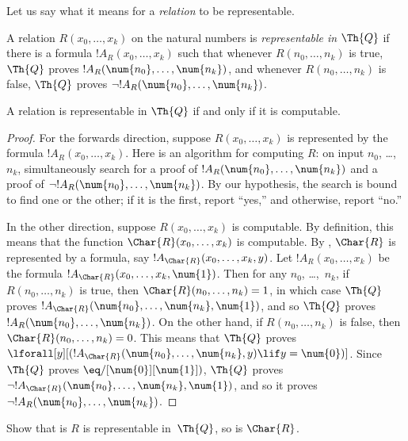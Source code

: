 \documentclass[../../../include/open-logic-section]{subfiles}
\begin{document}


Let us say what it means for a \emph{relation} to be representable.

\begin{defn}
 A relation $R(x_0,\dots,x_k)$ on
the natural numbers is {\em representable in $\Th{Q}$} if there is a
formula $!A_R(x_0,\dots,x_k)$ such that whenever $R(n_0,\dots,n_k)$ is
true, $\Th{Q}$ proves $!A_R(\num{n_0},\dots,\num{n_k})$, and whenever
$R(n_0,\dots,n_k)$ is false, $\Th{Q}$ proves $\lnot !A_R(\num{n_0},
\dots, \num{n_k})$.
\end{defn}

\begin{thm}
 A relation is representable in
$\Th{Q}$ if and only if it is computable.
\end{thm}

\begin{proof}
For the forwards direction, suppose $R(x_0,\dots,x_k)$ is
represented by the formula $!A_R(x_0,\dots,x_k)$. Here is an
algorithm for computing $R$: on input $n_0$, \dots,~$n_k$, simultaneously
search for a proof of $!A_R(\num{n_0}, \dots, \num{n_k})$ and a proof of
$\lnot !A_R(\num{n_0}, \dots, \num{n_k})$. By our hypothesis, the search
is bound to find one or the other; if it is the first, report ``yes,''
and otherwise, report ``no.''

In the other direction, suppose $R(x_0, \dots, x_k)$ is computable. By
definition, this means that the function $\Char{R}(x_0, \dots, x_k)$
is computable. By , $\Char{R}$
is represented by a formula, say $!A_{\Char{R}}(x_0, \dots, x_k,
y)$. Let $!A_R(x_0, \dots, x_k)$ be the formula $!A_{\Char{R}}(x_0,
\dots, x_k, \num{1})$. Then for any $n_0$, \dots,~$n_k$, if $R(n_0,
\dots, n_k)$ is true, then $\Char{R}(n_0, \dots, n_k) = 1$, in which
case $\Th{Q}$ proves $!A_{\Char{R}}(\num{n_0}, \dots, \num{n_k},
\num{1})$, and so $\Th{Q}$ proves $!A_R(\num{n_0}, \dots,
\num{n_k})$. On the other hand, if $R(n_0, \dots, n_k)$ is false, then
$\Char{R}(n_0, \dots, n_k) = 0$. This means that $\Th{Q}$ proves
$\lforall[y][(!A_{\Char{R}}(\num{n_0}, \dots, \num{n_k}, y) \lif y =
  \num{0})]$. Since $\Th{Q}$ proves $\eq/[\num{0}][\num{1}])$,
$\Th{Q}$ proves $\lnot !A_{\Char{R}}(\num{n_0}, \dots, \num{n_k},
\num{1})$, and so it proves $\lnot !A_R(\num{n_0}, \dots, \num{n_k})$.
\end{proof}

\begin{prob}
Show that is $R$ is representable in~$\Th{Q}$, so is $\Char{R}$.
\end{prob}
\end{document}
